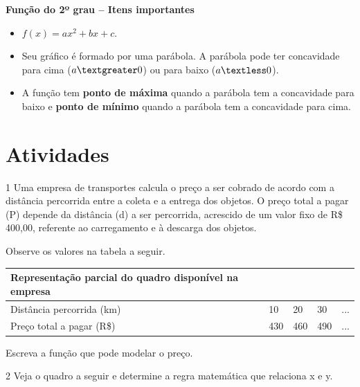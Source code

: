 \begin{escolha}
\begin{escolha}
{\begin{itemize}
\end{itemize}

\textbf{Função do 2º grau -- Itens importantes}

\begin{itemize}
  
  \item $f(x) = ax^2 + bx + c$.
  
  \item Seu gráfico é formado por uma parábola. A parábola pode ter concavidade
  para cima ($a\textgreater0$) ou para baixo ($a\textless0$).
  
  \item A função tem \textbf{ponto de máxima} quando a parábola tem a concavidade para baixo e \textbf{ponto de mínimo} quando a parábola tem a
  concavidade para cima.

\end{itemize}
}

\section{Atividades}

\num{1} Uma empresa de transportes calcula o preço a ser cobrado de acordo
com a distância percorrida entre a coleta e a entrega dos objetos. O
preço total a pagar (P) depende da distância (d) a ser percorrida,
acrescido de um valor fixo de R\$ 400,00, referente ao carregamento e à
descarga dos objetos.

Observe os valores na tabela a seguir.

\begin{longtable}[]{@{}lllll@{}}
\toprule
\textbf{Representação parcial do quadro disponível na
empresa}\tabularnewline
\midrule
\endhead
Distância percorrida (km) & 10 & 20 & 30 & ...\tabularnewline
Preço total a pagar (R\$) & 430 & 460 & 490 & ...\tabularnewline
\bottomrule
\end{longtable}

Escreva a função que pode modelar o preço.

\begin{boxpeq}
\end{boxpeq}

\num{2} Veja o quadro a seguir e determine a regra matemática que relaciona x
e y.


\end{escolha}
\end{escolha}
